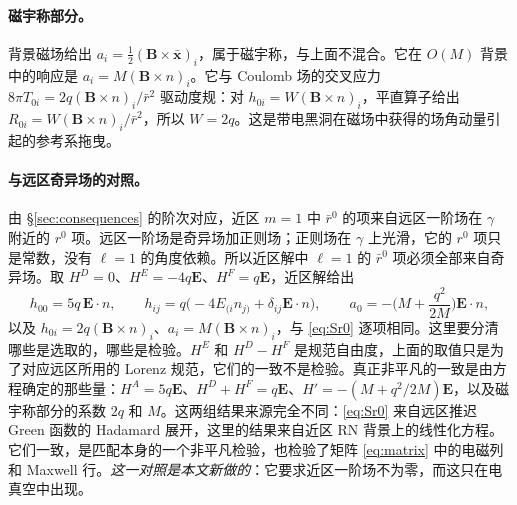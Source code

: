 \documentclass[11pt,a4paper]{ctexart}
\begin{document}
\paragraph{磁宇称部分。}背景磁场给出 $a_i=\tfrac12(\boldsymbol B\times\bar{\boldsymbol x})_i$，属于磁宇称，与上面不混合。它在 $O(M)$ 背景中的响应是 $a_i=M(\boldsymbol B\times n)_i$。它与 Coulomb 场的交叉应力 $8\pi T_{0i}=2q(\boldsymbol B\times n)_i/\bar r^2$ 驱动度规：对 $h_{0i}=W(\boldsymbol B\times n)_i$，平直算子给出 $R_{0i}=W(\boldsymbol B\times n)_i/\bar r^2$，所以 $W=2q$。这是带电黑洞在磁场中获得的场角动量引起的参考系拖曳。

\paragraph{与远区奇异场的对照。}由 \S\ref{sec:consequences} 的阶次对应，近区 $m=1$ 中 $\bar r^0$ 的项来自远区一阶场在 $\gamma$ 附近的 $r^0$ 项。远区一阶场是奇异场加正则场；正则场在 $\gamma$ 上光滑，它的 $r^0$ 项只是常数，没有 $\ell=1$ 的角度依赖。所以近区解中 $\ell=1$ 的 $\bar r^0$ 项必须全部来自奇异场。取 $H^D=0$、$H^E=-4q\boldsymbol E$、$H^F=q\boldsymbol E$，近区解给出
\begin{equation*}
h_{00}=5q\,\boldsymbol E\cdot n,\qquad h_{ij}=q\big(-4E_{(i}n_{j)}+\delta_{ij}\boldsymbol E\cdot n\big),\qquad a_0=-\Big(M+\frac{q^2}{2M}\Big)\boldsymbol E\cdot n,
\end{equation*}
以及 $h_{0i}=2q(\boldsymbol B\times n)_i$、$a_i=M(\boldsymbol B\times n)_i$，与 \eqref{eq:Sr0} 逐项相同。这里要分清哪些是选取的，哪些是检验。$H^E$ 和 $H^D-H^F$ 是规范自由度，上面的取值只是为了对应远区所用的 Lorenz 规范，它们的一致不是检验。真正非平凡的一致是由方程确定的那些量：$H^A=5q\boldsymbol E$、$H^D+H^F=q\boldsymbol E$、$H'=-(M+q^2/2M)\boldsymbol E$，以及磁宇称部分的系数 $2q$ 和 $M$。这两组结果来源完全不同：\eqref{eq:Sr0} 来自远区推迟 Green 函数的 Hadamard 展开，这里的结果来自近区 RN 背景上的线性化方程。它们一致，是匹配本身的一个非平凡检验，也检验了矩阵 \eqref{eq:matrix} 中的电磁列和 Maxwell 行。\emph{这一对照是本文新做的}：它要求近区一阶场不为零，而这只在电真空中出现。
\end{document}
